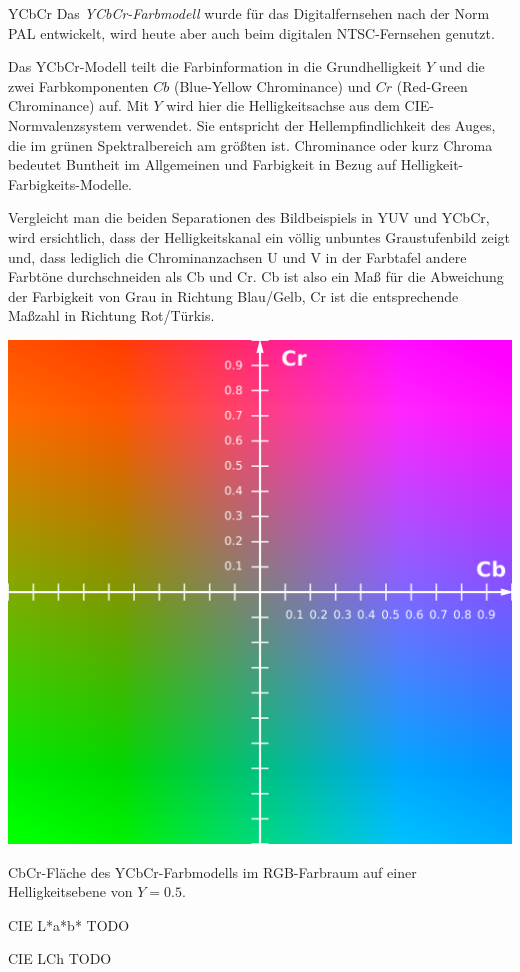 \begin{defi}[Farbmodell]{YCbCr}
    Das \emph{YCbCr-Farbmodell} wurde für das Digitalfernsehen nach der Norm PAL entwickelt, wird heute aber auch beim digitalen NTSC-Fernsehen genutzt.

    Das YCbCr-Modell teilt die Farbinformation in die Grundhelligkeit $Y$ und die zwei Farbkomponenten $Cb$ (Blue-Yellow Chrominance) und $Cr$ (Red-Green Chrominance) auf.
    Mit $Y$ wird hier die Helligkeitsachse aus dem CIE-Normvalenzsystem verwendet.
    Sie entspricht der Hellempfindlichkeit des Auges, die im grünen Spektralbereich am größten ist.
    Chrominance oder kurz Chroma bedeutet Buntheit im Allgemeinen und Farbigkeit in Bezug auf Helligkeit-Farbigkeits-Modelle.

    Vergleicht man die beiden Separationen des Bildbeispiels in YUV und YCbCr, wird ersichtlich, dass der Helligkeitskanal ein völlig unbuntes Graustufenbild zeigt und, dass lediglich die Chrominanzachsen U und V in der Farbtafel andere Farbtöne durchschneiden als Cb und Cr.
    Cb ist also ein Maß für die Abweichung der Farbigkeit von Grau in Richtung Blau/Gelb, Cr ist die entsprechende Maßzahl in Richtung Rot/Türkis.

    \centering
    \includegraphics[width=.4\linewidth]{figures/YCbCr-CbCr_Scaled_Y50.png}

    CbCr-Fläche des YCbCr-Farbmodells im RGB-Farbraum auf einer Helligkeitsebene von $Y = 0.5$.
\end{defi}

\begin{bonus}[Farbmodell]{CIE L*a*b*}
    TODO
\end{bonus}

\begin{bonus}[Farbmodell]{CIE LCh}
    TODO
\end{bonus}